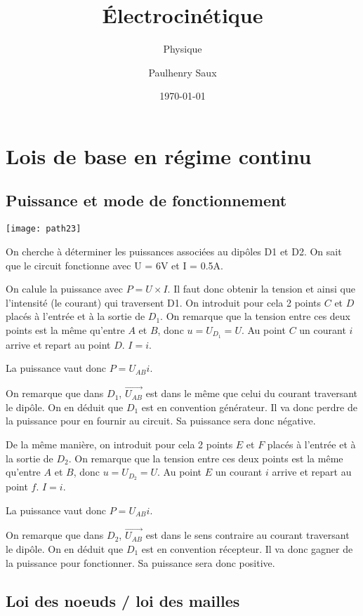\documentclass[french]{yLectureNote}
\title{Électrocinétique}
\subtitle{Physique}
\author{Paulhenry Saux}
\date{\today}
\renewcommand{\vec}{\overrightarrow}
\begin{document}
	\chapter{Lois de base en régime continu}
\section{Puissance et mode de fonctionnement}
\texttt{[image: path23]}

On cherche à déterminer les puissances associées au dip\^oles D1 et D2. On sait que le circuit fonctionne avec U = 6V et I = 0.5A.

On calule la puissance avec $P=U\times I$. Il faut donc obtenir la tension et ainsi que l'intensité (le courant) qui traversent D1. On introduit pour cela 2 points $C$ et $D$ placés à l'entrée et à la sortie de $D_1$. On remarque que la tension entre ces deux points est la m\^eme qu'entre $A$ et $B$, donc $u=U_{D_1} = U$. Au point $C$ un courant $i$ arrive et repart au point $D$. $I = i$.

La puissance vaut donc $P = U_{AB}i$.

On remarque que dans $D_1$, $\vec{U_{AB}}$ est dans le m\^eme que celui du courant traversant le dip\^ole. On en déduit que $D_1$ est en convention générateur. Il va donc perdre de la puissance pour en fournir au circuit. Sa puissance sera donc négative.

De la m\^eme manière, on introduit pour cela 2 points $E$ et $F$ placés à l'entrée et à la sortie de $D_2$. On remarque que la tension entre ces deux points est la m\^eme qu'entre $A$ et $B$, donc $u=U_{D_2} = U$. Au point $E$ un courant $i$ arrive et repart au point $f$. $I = i$.

La puissance vaut donc $P = U_{AB}i$.

On remarque que dans $D_2$, $\vec{U_{AB}}$ est dans le sens contraire au courant traversant le dip\^ole. On en déduit que $D_1$ est en convention récepteur. Il va donc gagner de la puissance pour fonctionner. Sa puissance sera donc positive.
\section{Loi des noeuds / loi des mailles}
\end{document}
